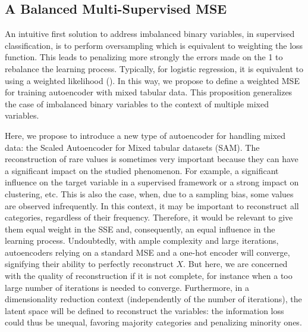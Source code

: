 \documentclass{article}
\theoremstyle{definition}
\begin{document}








\subsection{A Balanced Multi-Supervised MSE}
\label{Proposition}

An intuitive first solution to address imbalanced binary variables, in supervised classification, is to perform oversampling which is equivalent to weighting the loss function. This leads to penalizing more strongly the errors made on the 1 to rebalance the learning process. Typically, for logistic regression, it is equivalent to using a weighted likelihood (\citep{king2001logistic}). In this way, we propose to define a weighted MSE for training autoencoder with mixed tabular data. This proposition generalizes the case of imbalanced binary variables to the context of multiple mixed variables. 
  
Here, we propose to introduce a new type of autoencoder for handling mixed data: the Scaled Autoencoder for Mixed tabular datasets (SAM). The reconstruction of rare values is sometimes very important because they can have a significant impact on the studied phenomenon. For example, a significant influence on the target variable in a supervised framework or a strong impact on clustering, etc. This is also the case, when, due to a sampling bias, some values are observed infrequently. 
In this context, it may be important to reconstruct all categories, regardless of their frequency. Therefore, it would be relevant to give them equal weight in the SSE and, consequently, an equal influence in the learning process.
Undoubtedly, with ample complexity and large iterations, autoencoders relying on a standard MSE and a one-hot encoder will converge, signifying their ability to perfectly reconstruct $X$. But here, we are concerned with the quality of reconstruction if it is not complete, for instance when a too large number of iterations is needed to converge. Furthermore, in a dimensionality reduction context (independently of the number of iterations), the latent space will be defined to reconstruct the variables: the information loss could thus be unequal, favoring majority categories and penalizing minority ones.
\end{document}
